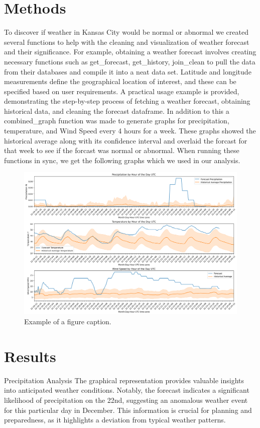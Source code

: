 \documentclass[conference]{IEEEtran}
\begin{document}
\section{Methods}
    To discover if weather in Kansas City would be normal or abnormal we created several functions to help with the cleaning and visualization of weather forecast and their significance. For example, obtaining a weather forecast involves creating necessary functions such as get_forecast, get_history, join_clean to pull the data from their databases and compile it into a neat data set. Latitude and longitude measurements define the geographical location of interest, and these can be specified based on user requirements. A practical usage example is provided, demonstrating the step-by-step process of fetching a weather forecast, obtaining historical data, and cleaning the forecast dataframe. In addition to this a combined_graph function was made to generate graphs for precipitation, temperature, and Wind Speed every 4 hours for a week. These graphs showed the historical average along with its confidence interval and overlaid the forcast for that week to see if the forcast was normal or abnormal. When running these functions in sync, we get the following graphs which we used in our analysis.

\begin{figure}[htbp]
    \centerline{\includegraphics{example_graph.png}}
    \caption{Example of a figure caption.}
    \label{fig}
    \end{figure}

\section{Results}
Precipitation Analysis
The graphical representation provides valuable insights into anticipated weather conditions. Notably, the forecast indicates a significant likelihood of precipitation on the 22nd, suggesting an anomalous weather event for this particular day in December. This information is crucial for planning and preparedness, as it highlights a deviation from typical weather patterns.
\end{document}
